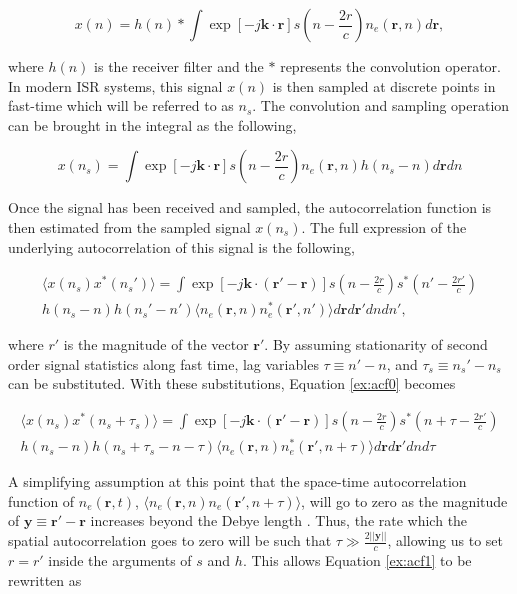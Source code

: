 \begin{equation}
\label{eq:xt}
x(n) = h(n) \ast \int \exp\left[-j\mathbf{k} \cdot \mathbf{r}\right]  s\left(n-\frac{2r}{c}\right) n_e(\mathbf{r},n) d\mathbf{r},
\end{equation}

\noindent where $h(n)$ is the receiver filter and the $\ast$ represents the convolution operator. In modern ISR systems, this signal $x(n)$ is then sampled at discrete points in fast-time which will be referred to as $n_s$. The convolution and sampling operation can be brought in the integral as the following,

\begin{equation}
\label{ex:xtaug}
x(n_s) = \int \exp\left[-j\mathbf{k} \cdot \mathbf{r}\right]  s\left(n-\frac{2r}{c}\right) n_e(\mathbf{r},n)h(n_s-n) d\mathbf{r}dn
\end{equation}


Once the signal has been received and sampled, the autocorrelation function is then estimated from the sampled signal $x(n_s)$. The full expression of the underlying autocorrelation of this signal is the following, 

\begin{multline}
\label{ex:acf0}
\langle x(n_s)x^*(n_s')\rangle =  \int \exp\left[-j \mathbf{k}\cdot \left(\mathbf{r}'-\mathbf{r} \right)\right]s\left(n-\frac{2r}{c}\right)s^*\left(n'-\frac{2r'}{c}\right) \\ h(n_s-n)h(n_s'-n')\langle n_e(\mathbf{r},n)n^*_e(\mathbf{r}',n')\rangle d\mathbf{r} d\mathbf{r}'dn dn',
\end{multline}

\noindent where $r'$ is the magnitude of the vector $\mathbf{r}'$. By assuming stationarity of second order signal statistics along fast time, lag variables $\tau\equiv n'-n$, and $\tau_s\equiv n_s'-n_s$ can be substituted. With these substitutions, Equation \ref{ex:acf0} becomes


\begin{multline}
\label{ex:acf1}
\langle x(n_s)x^*(n_s+\tau_s)\rangle =\int \exp\left[-j \mathbf{k}\cdot \left(\mathbf{r}'-\mathbf{r} \right)\right]s\left(n-\frac{2r}{c}\right)s^*\left(n+\tau-\frac{2r'}{c}\right) \\ h(n_s-n)h(n_s+\tau_s-n-\tau) \langle n_e(\mathbf{r},n)n^*_e(\mathbf{r}',n+\tau)\rangle d\mathbf{r} d\mathbf{r}' dnd\tau
\end{multline}

\noindent A simplifying assumption at this point that the space-time autocorrelation function of $n_e(\mathbf{r},t)$, $\langle n_e(\mathbf{r},n)n_e(\mathbf{r}',n+\tau)\rangle$, will go to zero as the magnitude of $\mathbf{y} \equiv \mathbf{r}'-\mathbf{r}$ increases beyond the Debye length \cite{farley1969}. Thus, the rate which the spatial autocorrelation goes to zero will be such that $\tau\gg \frac{2||\mathbf{y}||}{c}$, allowing us to set $r= r'$ inside the arguments of $s$ and $h$. This allows Equation \ref{ex:acf1} to be rewritten as 
 
